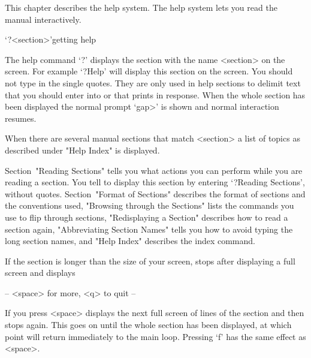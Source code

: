 %
%
%
%

This chapter describes the {\GAP} help system.
The help system lets you read the manual interactively.


\>`?<section>'{getting help}

The help command `?' displays the section with the name <section> on the
screen. For example `?Help' will display this section on the screen.
You should not type in the single quotes. They are only used in help
sections to delimit text that you should enter into {\GAP} or that {\GAP}
prints in response. When the whole section has been displayed the normal
{\GAP} prompt `gap>' is shown and normal {\GAP} interaction resumes.

When there are several manual sections that match <section> a list of topics
as described under "Help Index" is displayed.

Section~"Reading Sections" tells you what actions you can perform
while you are reading a section. You tell {\GAP} to display this
section by entering `?Reading Sections', without quotes.
Section~"Format of Sections" describes the format of sections and the
conventions used,
"Browsing through the Sections" lists the commands you use to flip
through sections, "Redisplaying a Section" describes how to read a
section again, "Abbreviating Section Names" tells you how to avoid typing
the long section names, and "Help Index" describes the index command.


If the section is longer than the size of your screen, {\GAP} stops after
displaying a full screen and displays

\begintt
-- <space> for more, <q> to quit --
\endtt

If you press <space> {\GAP} displays the next full screen of lines of the
section and then stops again.
This goes on until the whole section has been displayed,
at which point {\GAP} will return immediately to the main {\GAP} loop.
Pressing `f' has the same effect as <space>.

